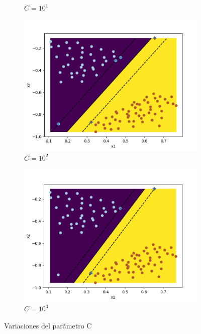 \begin{figure}[H]
\begin{subfigure}{0.48\textwidth}
    	\caption{$C = 10^{1}$}
	\end{subfigure}
	\begin{subfigure}{0.48\textwidth}
    	\includegraphics[width=\linewidth, height=1\linewidth]{img/10_2}	
    	\caption{$C = 10^{2}$}
	\end{subfigure}
	\begin{subfigure}{0.48\textwidth}
    	\includegraphics[width=\linewidth, height=1\linewidth]{img/10_3}	
    	\caption{$C = 10^{3}$}
	\end{subfigure}
	\caption{Variaciones del parámetro C}
	\label{fig:var1}
\end{figure}
	
